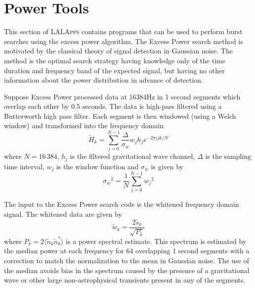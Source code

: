 
\clearpage

\section{Power Tools}
\label{section:powertools}

This section of \textsc{LALApps} contains programs that can be used to
perform burst searches using the excess power algorithm.   
The Excess Power search method is motivated by the classical theory of
signal detection in Gaussian noise.  The method is the optimal search
strategy having knowledge only of the time duration
and frequency band of the expected signal,  but having no other
information about the power distribution in advance of detection. 

Suppose Excess Power processed data at 16384Hz in 1 second segments 
which overlap each other by 0.5 seconds. The data is high-pass 
filtered using a 
Butterworth high pass filter.  Each segment is then windowed (using
a Welch window) and transformed into the frequency domain 
\begin{equation}
\tilde{H}_k =  \sum_{j=0}^{N-1}\frac{\Delta}{\sigma_w}w_jh_j e^{-2 \pi i j k /N}
\end{equation}
where $N=16\, 384$, $h_j$ is the filtered gravitational 
wave channel, $\Delta$ is the sampling time interval, $w_j$ is the window
function and $\sigma_w$ is given by 
\begin{equation}
{\sigma_w}^2 = \frac{1}{N}\sum_{j=0}^{N-1}{w_j}^2
\end{equation}

 The input to the Excess Power search code is the whitened 
frequency domain signal.  The whitened data are given by
\begin{equation}
\tilde{w}_k = \frac{ 2 \tilde{s}_k } {\sqrt{ P_k }}
\end{equation}
where $P_k = 2 \langle \tilde{n}_k \tilde{n}_k^\ast \rangle$ is a
power spectral estimate.  This spectrum is estimated by the median
power at each frequency for 64 overlapping 1 second segments with a
correction to match the normalization to the mean in Gaussian noise.
The use of the median avoids bias in the spectrum caused by the
presence of a gravitational wave or other large non-astrophysical
transients present in any of the segments.   

